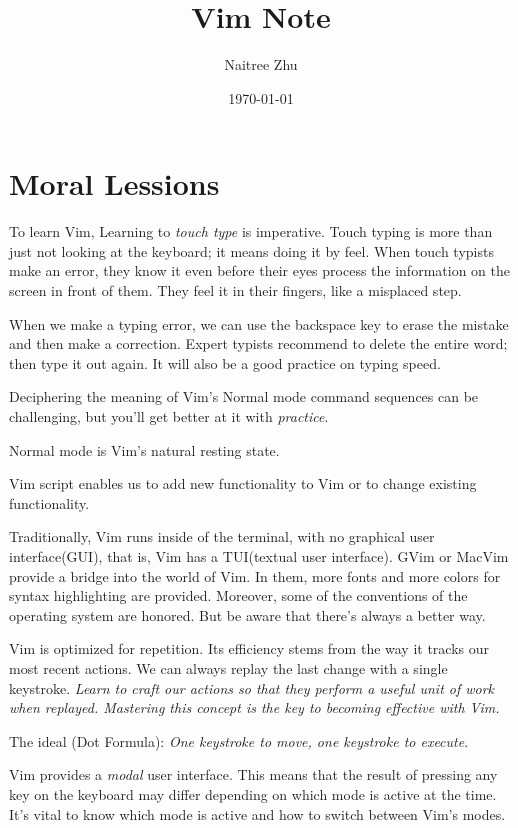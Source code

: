 \documentclass{article}
\title{Vim Note}
\author{Naitree Zhu}
\date{\today}
\begin{document}
\maketitle
\part{Moral Lessions}
To learn Vim, Learning to \emph{touch type} is imperative.
Touch typing is more than just not looking at the keyboard; it means doing it by feel. When touch typists make an error, they know it even before their eyes process the information on the screen in front of them. They feel it in their fingers, like a misplaced step.

When we make a typing error, we can use the backspace key to erase the mistake and then make a correction.
Expert typists recommend to delete the entire word; then type it out again.
It will also be a good practice on typing speed.

Deciphering the meaning of Vim's Normal mode command sequences can be challenging, but you'll get better at it with \emph{practice}.


Normal mode is Vim's natural resting state.

Vim script enables us to add new functionality to Vim or to change existing functionality.

Traditionally, Vim runs inside of the terminal, with no graphical user interface(GUI), that is, Vim has a TUI(textual user interface). GVim or MacVim provide a bridge into the world of Vim. In them, more fonts and more colors for syntax highlighting are provided. Moreover, some of the conventions of the operating system are honored. But be aware that there's always a better way.

Vim is optimized for repetition. Its efficiency stems from the way it tracks our most recent actions. We can always replay the last change with a single keystroke. \emph{Learn to craft our actions so that they perform a useful unit of work when replayed. Mastering this concept is the key to becoming effective with Vim.}

The ideal (Dot Formula): \emph{One keystroke to move, one keystroke to execute}.

Vim provides a \emph{modal} user interface. This means that the result of pressing any key on the keyboard may differ depending on which mode is active at the time. It's vital to know which mode is active and how to switch between Vim's modes.
\end{document}
